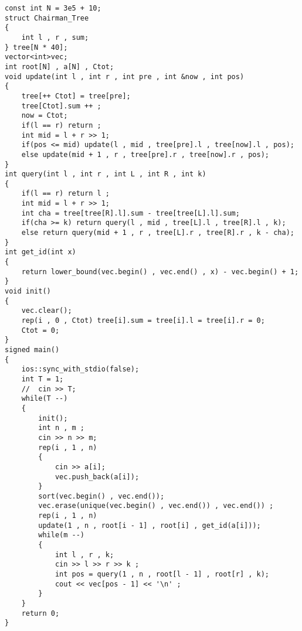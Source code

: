 \documentclass[E:/GsjzTle/main/main.tex]{subfiles}
\begin{document}
\begin{lstlisting}
const int N = 3e5 + 10;
struct Chairman_Tree
{
	int l , r , sum;
} tree[N * 40];
vector<int>vec;
int root[N] , a[N] , Ctot;
void update(int l , int r , int pre , int &now , int pos)
{
	tree[++ Ctot] = tree[pre];
	tree[Ctot].sum ++ ;
	now = Ctot;
	if(l == r) return ;
	int mid = l + r >> 1;
	if(pos <= mid) update(l , mid , tree[pre].l , tree[now].l , pos);
	else update(mid + 1 , r , tree[pre].r , tree[now].r , pos);
}
int query(int l , int r , int L , int R , int k)
{
	if(l == r) return l ;
	int mid = l + r >> 1;
	int cha = tree[tree[R].l].sum - tree[tree[L].l].sum;
	if(cha >= k) return query(l , mid , tree[L].l , tree[R].l , k);
	else return query(mid + 1 , r , tree[L].r , tree[R].r , k - cha);
}
int get_id(int x)
{
	return lower_bound(vec.begin() , vec.end() , x) - vec.begin() + 1;
}
void init()
{
	vec.clear();
	rep(i , 0 , Ctot) tree[i].sum = tree[i].l = tree[i].r = 0;
	Ctot = 0;
}
signed main()
{
	ios::sync_with_stdio(false);
	int T = 1;
	//	cin >> T;
	while(T --)
	{
		init();
		int n , m ;
		cin >> n >> m;
		rep(i , 1 , n)
		{
			cin >> a[i];
			vec.push_back(a[i]);
		}
		sort(vec.begin() , vec.end());
		vec.erase(unique(vec.begin() , vec.end()) , vec.end()) ;
		rep(i , 1 , n)
		update(1 , n , root[i - 1] , root[i] , get_id(a[i]));
		while(m --)
		{
			int l , r , k;
			cin >> l >> r >> k ;
			int pos = query(1 , n , root[l - 1] , root[r] , k);
			cout << vec[pos - 1] << '\n' ;
		}
	}
	return 0;
}
\end{lstlisting}
\end{document}
